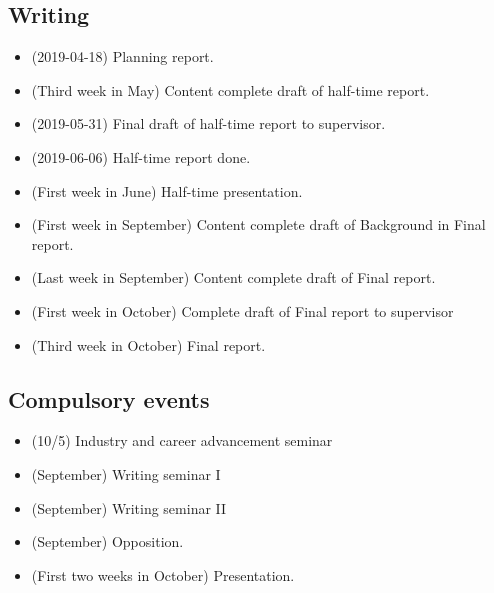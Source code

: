 \documentclass[parskip=half]{scrartcl}
\begin{document}
\subsection{Writing}
\begin{itemize}
  \item (2019-04-18) Planning report.
  \item (Third week in May) Content complete draft of half-time report.
  \item (2019-05-31) Final draft of half-time report to supervisor.
  \item (2019-06-06) Half-time report done.
  \item (First week in June) Half-time presentation.
  \item (First week in September) Content complete draft of Background in Final
    report.
  \item (Last week in September) Content complete draft of Final report.
  \item (First week in October) Complete draft of Final report to supervisor
  \item (Third week in October) Final report.
\end{itemize}

\subsection{Compulsory events}
\begin{itemize}
  \item (10/5) Industry and career advancement seminar
  \item (September) Writing seminar I
  \item (September) Writing seminar II
  \item (September) Opposition.
  \item (First two weeks in October) Presentation.
\end{itemize}









% 

\printbibliography{}
\end{document}
